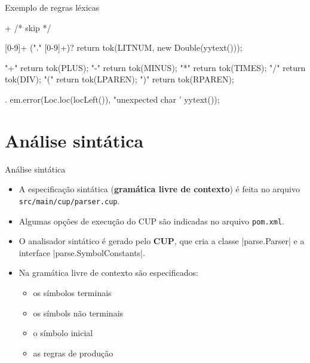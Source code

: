 \begin{frame}{Exemplo de regras léxicas}
\begin{pygmented}[lang=text]
[ \t\f\n\r]+           { /* skip */ }

[0-9]+ ("." [0-9]+)?   { return tok(LITNUM, new Double(yytext())); }

"+"                    { return tok(PLUS); }
"-"                    { return tok(MINUS); }
"*"                    { return tok(TIMES); }
"/"                    { return tok(DIV); }
"("                    { return tok(LPAREN); }
")"                    { return tok(RPAREN); }

.                      { em.error(Loc.loc(locLeft()),
                                  "unexpected char '%
                                  yytext()); }
\end{pygmented}
\end{frame}


\section{Análise sintática}

\begin{frame}{Análise sintática}
  \begin{itemize}
    \item A especificação sintática (\textbf{gramática livre de
      contexto}) é feita no arquivo
    \alert{\texttt{src/main/cup/parser.cup}}.
    \item Algumas opções de execução do CUP são indicadas no arquivo
    \alert{\texttt{pom.xml}}.
    \item O analisador sintático é gerado pelo \textbf{CUP}, que cria
    a classe \pyginline|parse.Parser| e a interface
    \pyginline|parse.SymbolConstants|.
    \item Na gramática livre de contexto são especificados:
    \begin{itemize}
      \item os símbolos terminais
      \item os símbols não terminais
      \item o símbolo inicial
      \item as regras de produção
    \end{itemize}
  \end{itemize}
\end{frame}

